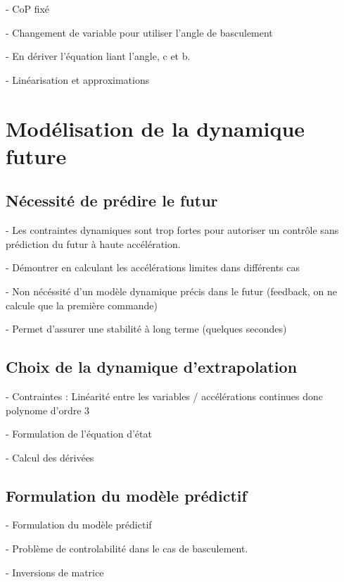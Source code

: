 			- CoP fixé

			- Changement de variable pour utiliser l'angle de basculement
	
			- En dériver l'équation liant l'angle, c et b. 
		
			- Linéarisation et approximations

	\section{Modélisation de la dynamique future}
		\subsection{Nécessité de prédire le futur}

			- Les contraintes dynamiques sont trop fortes pour autoriser un contrôle sans prédiction du futur à haute accélération.

			- Démontrer en calculant les accélérations limites dans différents cas

			- Non nécéssité d'un modèle dynamique précis dans le futur (feedback, on ne calcule que la première commande)

			- Permet d'assurer une stabilité à long terme (quelques secondes)
		\subsection{Choix de la dynamique d'extrapolation}

			- Contraintes : Linéarité entre les variables / accélérations continues donc polynome d'ordre 3

			- Formulation de l'équation d'état

			- Calcul des dérivées

		\subsection{Formulation du modèle prédictif}

			- Formulation du modèle prédictif

			- Problème de controlabilité dans le cas de basculement.
			
			- Inversions de matrice
